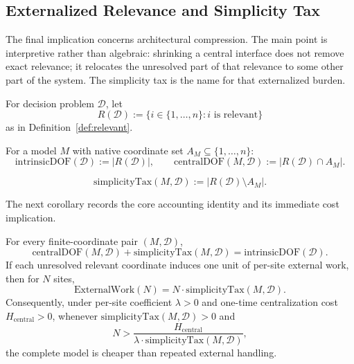 \subsection{Externalized Relevance and Simplicity Tax}\label{sec:simplicity-tax}

The final implication concerns architectural compression. The main point is interpretive rather than algebraic: shrinking a central interface does not remove exact relevance; it relocates the unresolved part of that relevance to some other part of the system. The simplicity tax is the name for that externalized burden.

\begin{definition}
For decision problem $\mathcal{D}$, let
\[
R(\mathcal{D}) := \{i \in \{1,\ldots,n\}: i \text{ is relevant}\}
\]
as in Definition~\ref{def:relevant}.
\end{definition}

\begin{definition}
For a model $M$ with native coordinate set $A_M \subseteq \{1,\ldots,n\}$:
\[
\mathrm{intrinsicDOF}(\mathcal{D}) := |R(\mathcal{D})|,
\qquad
\mathrm{centralDOF}(M,\mathcal{D}) := |R(\mathcal{D}) \cap A_M|.
\]
\end{definition}

\begin{definition}
\[
\mathrm{simplicityTax}(M,\mathcal{D}) := |R(\mathcal{D}) \setminus A_M|.
\]
\end{definition}

The next corollary records the core accounting identity and its immediate cost implication.

\begin{corollary}
For every finite-coordinate pair $(M,\mathcal{D})$,
\[
\mathrm{centralDOF}(M,\mathcal{D}) + \mathrm{simplicityTax}(M,\mathcal{D})
=
\mathrm{intrinsicDOF}(\mathcal{D}).
\]
If each unresolved relevant coordinate induces one unit of per-site external work, then for $N$ sites,
\[
\mathrm{ExternalWork}(N) = N \cdot \mathrm{simplicityTax}(M,\mathcal{D}).
\]
Consequently, under per-site coefficient $\lambda>0$ and one-time centralization cost $H_{\mathrm{central}}>0$, whenever $\mathrm{simplicityTax}(M,\mathcal{D})>0$ and
\[
N > \frac{H_{\mathrm{central}}}{\lambda \cdot \mathrm{simplicityTax}(M,\mathcal{D})},
\]
the complete model is cheaper than repeated external handling.
\end{corollary}

